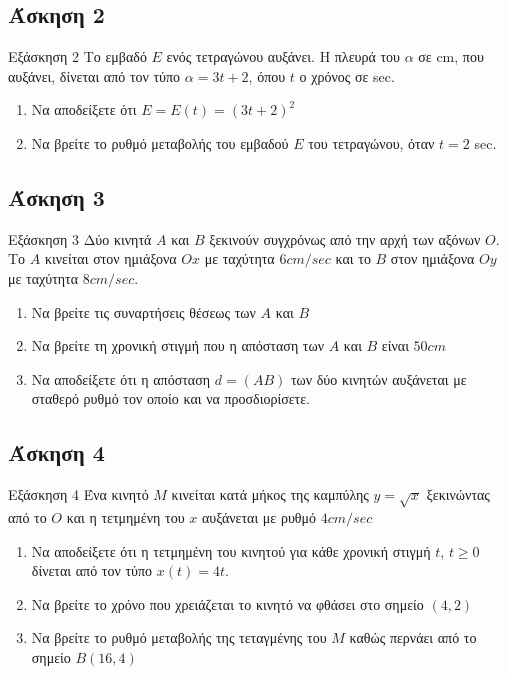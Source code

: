 \documentclass[greek]{beamer}
\begin{document}
\subsection{Άσκηση 2}
\begin{frame}[label=Άσκηση2]{Εξάσκηση 2}
 Το εμβαδό $Ε$ ενός τετραγώνου αυξάνει. Η πλευρά του $α$ σε cm, που αυξάνει, δίνεται από τον τύπο $α=3t+2$, όπου $t$ ο χρόνος σε sec.
 \begin{enumerate}
  \item<1-> Να αποδείξετε ότι $Ε=Ε(t)=(3t+2)^2$
  \item<2-> Να βρείτε το ρυθμό μεταβολής του εμβαδού $Ε$ του τετραγώνου, όταν $t=2$ sec.
 \end{enumerate}

\end{frame}

\subsection{Άσκηση 3}
\begin{frame}[label=Άσκηση3]{Εξάσκηση 3}
 Δύο κινητά $Α$ και $Β$ ξεκινούν συγχρόνως από την αρχή των αξόνων $Ο$. Το $Α$ κινείται στον ημιάξονα $Οx$ με ταχύτητα $6cm/sec$ και το $Β$ στον ημιάξονα $Οy$ με ταχύτητα $8cm/sec$.
 \begin{enumerate}
  \item<1-> Να βρείτε τις συναρτήσεις θέσεως των $Α$ και $Β$
  \item<2-> Να βρείτε τη χρονική στιγμή που η απόσταση των $Α$ και $Β$ είναι $50cm$
  \item<3-> Να αποδείξετε ότι η απόσταση $d=(ΑΒ)$ των δύο κινητών αυξάνεται με σταθερό ρυθμό τον οποίο και να προσδιορίσετε.
 \end{enumerate}

\end{frame}

\subsection{Άσκηση 4}
\begin{frame}[label=Άσκηση4]{Εξάσκηση 4}
 Ένα κινητό $Μ$ κινείται κατά μήκος της καμπύλης $y=\sqrt{x}$ ξεκινώντας από το $Ο$ και η τετμημένη του $x$ αυξάνεται με ρυθμό $4cm/sec$
 \begin{enumerate}
  \item<1-> Να αποδείξετε ότι η τετμημένη του κινητού για κάθε χρονική στιγμή $t$, $t\ge 0$ δίνεται από τον τύπο $x(t)=4t$.
  \item<2-> Να βρείτε το χρόνο που χρειάζεται το κινητό να φθάσει στο σημείο $(4,2)$
  \item<3-> Να βρείτε το ρυθμό μεταβολής της τεταγμένης του $Μ$ καθώς περνάει από το σημείο $Β(16,4)$
 \end{enumerate}

\end{frame}
\end{document}
